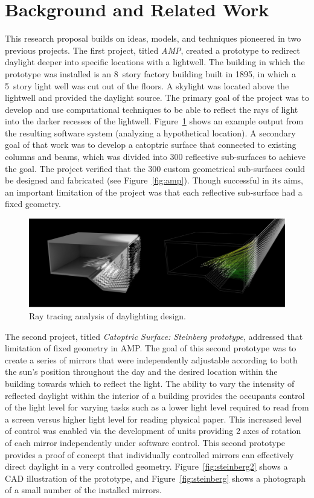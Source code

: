 \section{Background and Related Work}
\label{sec:background}

This research proposal builds on ideas, models, and techniques pioneered in two 
previous projects.
The first project, titled \emph{AMP}, created a prototype to redirect
daylight deeper into specific locations with a lightwell.
The building in which the prototype was installed is an 8~story factory
building built in 1895, in which a 5~story light well was cut out of
the floors. A skylight was located above the lightwell and provided the
daylight source.  The primary goal of the project was to develop and use
computational techniques to be able to reflect the rays of light into
the darker recesses of the lightwell. 
Figure~\ref{fig:raytracing} shows an example output from the resulting software
system (analyzing a hypothetical location).
A secondary goal of that work was to develop
a catoptric surface that connected to existing columns and beams, which was
divided into 300 reflective sub-surfaces to achieve the goal.
The project verified that the 300 custom geometrical sub-surfaces
could be designed and fabricated (see Figure~\ref{fig:amp}).
Though successful in its aims, an important limitation of the project
was that each reflective sub-surface had a fixed geometry.

\begin{figure}[ht]
\centering
\includegraphics[width=0.8\linewidth]{figures/raytracing}
\caption{Ray tracing analysis of daylighting design.}
\label{fig:raytracing}
\end{figure}

The second project, titled \emph{Catoptric Surface: Steinberg prototype},
addressed that limitation of fixed geometry in AMP. The goal of this second
prototype was to create a series of mirrors that were independently
adjustable according to both the sun's position throughout the day and the desired
location within the building towards which to reflect the light. The ability to
vary the intensity of reflected daylight within the interior of a
building provides the occupants control of the light level for varying tasks
such as a lower light level required to read from a screen versus higher
light level for reading physical paper. This increased level of control
was enabled via the development of units providing 2 axes of rotation of each mirror
independently under software control. This second prototype provides a proof
of concept that individually controlled mirrors can effectively direct
daylight in a very controlled geometry. 
Figure~\ref{fig:steinberg2} shows a CAD illustration of the prototype,
and Figure~\ref{fig:steinberg} shows a photograph of a small number of
the installed mirrors.

